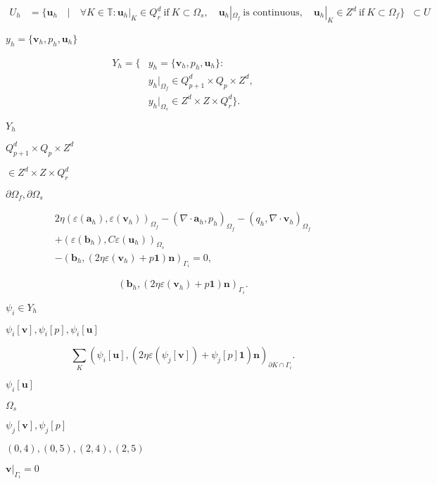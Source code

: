 \documentclass{article}
\begin{document}
\begin{align*} U_h &= \{{\mathbf u}_h \quad | \quad \forall K \in {\mathbb T}: {\mathbf u}_h|_K \in Q_r^d\ \text{if}\ K\subset {\Omega_s}, \quad {\mathbf u}_h|_{\Omega_f}\ \text{is continuous}, \quad {\mathbf u}_h|_K \in Z^d\ \text{if}\ K\subset {\Omega_f}\} && \subset U \end{align*}
\pagebreak

$y_h = \{\mathbf v_h, p_h, \mathbf u_h\}$
\pagebreak

\begin{align*} Y_h = \{ & y_h = \{\mathbf v_h, p_h, \mathbf u_h\} : \\ & y_h|_{\Omega_f} \in Q_{p+1}^d \times Q_p \times Z^d, \\ & y_h|_{\Omega_s} \in Z^d \times Z \times Q_r^d \}. \end{align*}
\pagebreak

$Y_h$
\pagebreak

$Q_{p+1}^d \times Q_p \times Z^d$
\pagebreak

$\in Z^d \times Z \times Q_r^d$
\pagebreak

$\partial\Omega_f,\partial\Omega_s$
\pagebreak

\begin{multline*} 2 \eta (\varepsilon(\mathbf a_h), \varepsilon(\mathbf v_h))_{\Omega_f} - (\nabla \cdot \mathbf a_h, p_h)_{\Omega_f} - (q_h, \nabla \cdot \mathbf v_h)_{\Omega_f} \\ + (\varepsilon(\mathbf b_h), C \varepsilon(\mathbf u_h))_{\Omega_s} \\ - (\mathbf b_h, (2 \eta \varepsilon(\mathbf v_h) + p \mathbf 1) \mathbf n)_{\Gamma_i} = 0, \end{multline*}
\pagebreak

\[ (\mathbf b_h, (2 \eta \varepsilon(\mathbf v_h) + p \mathbf 1) \mathbf n)_{\Gamma_i}. \]
\pagebreak

$\psi_i\in Y_h$
\pagebreak

$\psi_i[\mathbf v],\psi_i[p], \psi_i[\mathbf u]$
\pagebreak

\[ \sum_K (\psi_i[\mathbf u], (2 \eta \varepsilon(\psi_j[\mathbf v]) + \psi_j[p] \mathbf 1) \mathbf n)_{\partial K \cap \Gamma_i}. \]
\pagebreak

$\psi_i[\mathbf u]$
\pagebreak

$\Omega_s$
\pagebreak

$\psi_j[\mathbf v],\psi_j[p]$
\pagebreak

$(0,4),(0,5),(2,4),(2,5)$
\pagebreak

$\mathbf v|_{\Gamma_i}=0$
\pagebreak
\end{document}
